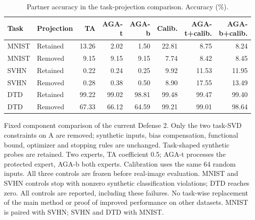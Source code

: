 \begin{table}[t]
\centering\small
\setlength{\tabcolsep}{4pt}
\caption{Partner accuracy in the task-projection comparison. Accuracy (\%).}
\label{tab:defense2_projection_partners}
\begin{tabular}{@{}llrrrrrr@{}}
\toprule
Task & Projection & TA & AGA-t & AGA-b & Calib. & AGA-t+calib. & AGA-b+calib. \\
\midrule
MNIST & Retained & 13.26 & 2.02 & 1.50 & 22.81 & 8.75 & 8.24 \\
MNIST & Removed & 9.15 & 9.15 & 9.15 & 7.74 & 8.42 & 8.45 \\
\midrule
SVHN & Retained & 0.22 & 0.24 & 0.25 & 9.92 & 11.53 & 11.95 \\
SVHN & Removed & 0.28 & 0.38 & 0.50 & 8.90 & 17.55 & 13.49 \\
\midrule
DTD & Retained & 99.22 & 99.02 & 98.81 & 99.48 & 99.47 & 99.40 \\
DTD & Removed & 67.33 & 66.12 & 64.59 & 99.21 & 99.01 & 98.64 \\
\bottomrule
\end{tabular}
\par\smallskip
\begin{minipage}{\textwidth}\footnotesize Fixed component comparison of the current Defense 2. Only the two task-SVD constraints on A are removed; synthetic inputs, bias compensation, functional bound, optimizer and stopping rules are unchanged. Task-shaped synthetic probes are retained. Two experts, TA coefficient 0.5; AGA-t processes the protected expert, AGA-b both experts. Calibration uses the same 64 random inputs. All three controls are frozen before real-image evaluation. MNIST and SVHN controls stop with nonzero synthetic classification violations; DTD reaches zero. All controls are reported, including these failures. No task-wise replacement of the main method or proof of improved performance on other datasets. MNIST is paired with SVHN; SVHN and DTD with MNIST.\end{minipage}
\end{table}

